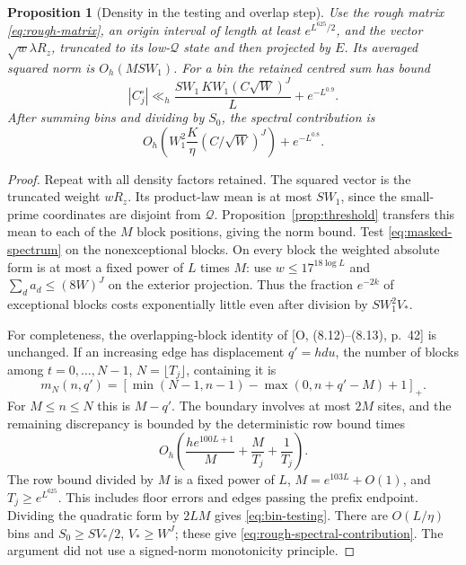 \documentclass[11pt]{article}
\newtheorem{proposition}[theorem]{Proposition}
\theoremstyle{definition}
\theoremstyle{remark}
\numberwithin{equation}{section}
\newcommand{\Qset}{\mathcal Q}
\begin{document}
\begin{proposition}[Density in the testing and overlap step]\label{prop:testing}
Use the rough matrix \eqref{eq:rough-matrix}, an origin interval of length at least $e^{L^{625}/2}$, and the vector
$\sqrt w\lambda R_z$, truncated to its low-$\Qset$ state and then projected by $E$.
Its averaged squared norm is $O_h(MSW_1)$.
For a bin the retained centred sum has bound
\begin{equation}\label{eq:bin-testing}
 |C_j^\circ|\ll_h \frac{SW_1\,KW_1(C\sqrt W)^J}{L}+e^{-L^{0.9}}.
\end{equation}
After summing bins and dividing by $S_0$, the spectral contribution is
\begin{equation}\label{eq:rough-spectral-contribution}
 O_h\left(W_1^2\frac K\eta(C/\sqrt W)^J\right)+e^{-L^{0.8}}.
\end{equation}
\end{proposition}
\begin{proof}
Repeat \cite[Proposition~8.4, pp.~41--42]{OpenAI007} with all density factors retained.
The squared vector is the truncated weight $wR_z$. Its product-law mean is at most $SW_1$, since the small-prime
coordinates are disjoint from $\Qset$. Proposition~\ref{prop:threshold} transfers this mean to each of the $M$
block positions, giving the norm bound. Test \eqref{eq:masked-spectrum} on the nonexceptional blocks.
On every block the weighted absolute form is at most a fixed power of $L$ times $M$: use
$w\le17^{18\log L}$ and $\sum_da_d\le(8W)^J$ on the exterior projection. Thus the fraction $e^{-2k}$ of
exceptional blocks costs exponentially little even after division by $SW_1^2V_*$.

For completeness, the overlapping-block identity of [O, (8.12)--(8.13), p.~42] is unchanged.
If an increasing edge has displacement $q'=hdu$, the number of blocks among $t=0,\ldots,N-1$, $N=\lfloor T_j\rfloor$,
containing it is
\begin{equation}\label{eq:overlap}
 m_N(n,q')=[\min(N-1,n-1)-\max(0,n+q'-M)+1]_+.
\end{equation}
For $M\le n\le N$ this is $M-q'$. The boundary involves at most $2M$ sites, and the remaining discrepancy is
bounded by the deterministic row bound times
\begin{equation}\label{eq:overlap-error}
 O_h\left(\frac{he^{100L+1}}M+\frac M{T_j}+\frac1{T_j}\right).
\end{equation}
The row bound divided by $M$ is a fixed power of $L$, $M=e^{103L}+O(1)$, and $T_j\ge e^{L^{625}}$.
This includes floor errors and edges passing the prefix endpoint. Dividing the quadratic form by $2LM$ gives
\eqref{eq:bin-testing}. There are $O(L/\eta)$ bins and $S_0\ge SV_*/2$, $V_*\ge W^J$; these give
\eqref{eq:rough-spectral-contribution}. The argument did not use a signed-norm monotonicity principle.
\end{proof}
\end{document}

